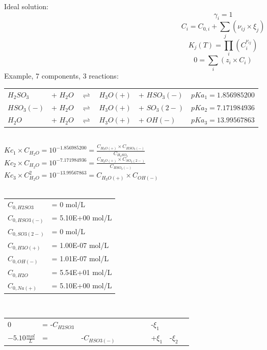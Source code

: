 \documentclass[preview]{standalone}
\begin{document}
\begin{landscape}
Ideal solution:
\begin{equation}
\gamma_i = 1
\end{equation}
\begin{equation}
C_i = C_{0,i} + \sum_j(\nu_{ij} \times \xi_j)
\end{equation}
\begin{equation}
K_j(T) = \prod_i(C_i^{\nu_{ij}})
\end{equation}
\begin{equation}
0 = \sum_i(z_i \times C_i)
\end{equation}
Example, 7 components, 3 reactions: \\
\begin{tabular}{llcll|l}
\hline
$H_2SO_3$ & + $H_2O$ & $\rightleftharpoons$ & $H_3O(+)$ & + $HSO_3(-)$ & $pKa_1=1.856985200$ \\
$HSO_3(-)$ & + $H_2O$ & $\rightleftharpoons$ & $H_3O(+)$ & + $SO_3(2-)$ & $pKa_2=7.171984936$ \\
$H_2O$ & + $H_2O$ & $\rightleftharpoons$ & $H_3O(+)$ & + $OH(-)$ & $pKa_3=13.99567863$\\
\hline
\end{tabular}
\\
$Kc_1 \times C_{H_2O} = 10^{-1.856985200} = \frac{C_{H_3O(+)} \times C_{HSO_3(-)}}{C_{H_2SO_3}}$
\\
$Kc_2 \times C_{H_2O} = 10^{-7.171984936} = \frac{C_{H_3O(+)} \times C_{SO_3(2-)}}{C_{HSO_3(-)}}$
\\
$Kc_3 \times C_{H_2O}^2 = 10^{-13.99567863} = C_{H_3O(+)} \times C_{OH(-)}$\\
\\
\begin{tabular}{ll}
\hline
$C_{0,H2SO3}$ & = 0 mol/L\\ 
$C_{0,HSO3(-)}$ & = 5.10E+00 mol/L \\ 
$C_{0,SO3(2-)}$ & = 0 mol/L \\ 
$C_{0,H3O(+)}$ & = 1.00E-07 mol/L \\ 
$C_{0,OH(-)}$ & = 1.01E-07 mol/L \\ 
$C_{0,H2O}$ & = 5.54E+01 mol/L \\ 
$C_{0,Na(+)}$ & = 5.10E+00 mol/L \\ 
\hline
\end{tabular} 
\\
\begin{tabular}{llllllllll}
0 &= -$C_{H2SO3}$ &  &  &  &  &  & -$\xi_1$ & & \\
$-5.10\frac{mol}{L}$ &=  & -$C_{HSO3(-)}$ &  &  &  &  & +$\xi_1$ & -$\xi_2$ &  \\

\end{tabular}
\end{landscape}
\end{document}
